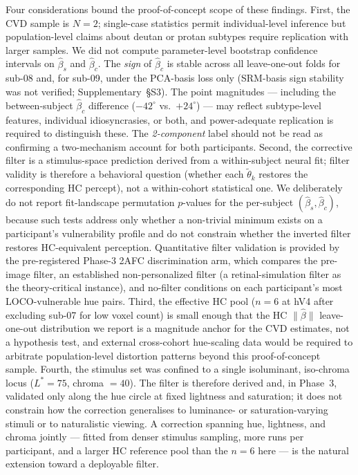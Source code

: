 Four considerations bound the proof-of-concept scope of these findings.
First, the CVD sample is $N = 2$; single-case statistics \cite{crawford1998} permit individual-level inference but population-level claims about deutan or protan subtypes require replication with larger samples.
We did not compute parameter-level bootstrap confidence intervals on $\hat\beta_s$ and $\hat\beta_c$.
The \emph{sign} of $\hat\beta_c$ is stable across all leave-one-out folds for sub-08 and, for sub-09, under the PCA-basis loss only (SRM-basis sign stability was not verified; Supplementary~\S S3).
The point magnitudes --- including the between-subject $\hat\beta_c$ difference ($-42^\circ$ vs.\ $+24^\circ$) --- may reflect subtype-level features, individual idiosyncrasies, or both, and power-adequate replication is required to distinguish these.
The \emph{2-component} label should not be read as confirming a two-mechanism account for both participants.
Second, the corrective filter is a stimulus-space prediction derived from a within-subject neural fit; filter validity is therefore a behavioral question (whether each $\tilde{\theta}_k$ restores the corresponding HC percept), not a within-cohort statistical one.
We deliberately do not report fit-landscape permutation $p$-values for the per-subject $(\hat\beta_s, \hat\beta_c)$, because such tests address only whether a non-trivial minimum exists on a participant's vulnerability profile and do not constrain whether the inverted filter restores HC-equivalent perception.
Quantitative filter validation is provided by the pre-registered Phase-3 2AFC discrimination arm, which compares the pre-image filter, an established non-personalized filter (a retinal-simulation filter as the theory-critical instance), and no-filter conditions on each participant's most LOCO-vulnerable hue pairs.
Third, the effective HC pool ($n = 6$ at hV4 after excluding sub-07 for low voxel count) is small enough that the HC $\|\hat\beta\|$ leave-one-out distribution we report is a magnitude anchor for the CVD estimates, not a hypothesis test, and external cross-cohort hue-scaling data would be required to arbitrate population-level distortion patterns beyond this proof-of-concept sample.
Fourth, the stimulus set was confined to a single isoluminant, iso-chroma locus ($L^{*} = 75$, chroma $= 40$).
The filter is therefore derived and, in Phase~3, validated only along the hue circle at fixed lightness and saturation; it does not constrain how the correction generalises to luminance- or saturation-varying stimuli or to naturalistic viewing.
A correction spanning hue, lightness, and chroma jointly --- fitted from denser stimulus sampling, more runs per participant, and a larger HC reference pool than the $n = 6$ here --- is the natural extension toward a deployable filter.

